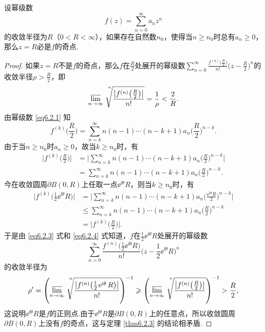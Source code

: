 \begin{prop}\label{prop6.2.4}
  设幂级数
  \[
    f(z) = \sum_{n=0}^\infty a_nz^n
  \]
  的收敛半径为$R$（$0<R<\infty$），如果存在自然数$n_0$，使得当$n\ge n_0$时总有$a_n\ge0$，那么$z=R$必是$f$的奇点.
\end{prop}
\begin{proof}
  如果$z=R$不是$f$的奇点，那么$f$在$\frac R2$处展开的幂级数$\sum_{n=0}^\infty
  \frac{f^{(n)}\big(\frac R2\big)}{n!}\bigg(z-\frac R2\bigg)^n$的收敛半径$\rho>\frac R2$，即
  \begin{equation}\label{eq6.2.3}
    \varlimsup_{n\to\infty}\sqrt[\leftroot{-4}\uproot{20}n]{
    \frac{\big|f^{(n)}\big(\frac R2\big)\big|}{n!}}=\frac1\rho<\frac2R.
  \end{equation}
  由幂级数 \eqref{eq6.2.1} 知
  \[
    f^{(k)}\bigg(\frac R2\bigg) = \sum_{n=k}^\infty n(n-1)\cdots(n-k+1)a_n
    \bigg(\frac R2\bigg)^{n-k}.
  \]
  由于当$n\ge n_0$时$a_n\ge0$，故当$k\ge n_0$时，有
  \begin{align*}
    \bigg|f^{(k)}\bigg(\frac R2\bigg)\bigg|
    & = \bigg|\sum_{n=k}^\infty n(n-1)\cdots(n-k+1)a_n\bigg(\frac R2\bigg)^{n-k}\bigg|\\
    & = \sum_{n=k}^\infty n(n-1)\cdots(n-k+1)a_n\bigg(\frac R2\bigg)^{n-k}.
  \end{align*}
  今在收敛圆周$\partial B(0,R)$上任取一点$\ee^{\ii\theta}R$，则当$k\ge n_0$时，有
  \begin{equation}\label{eq6.2.4}
    \begin{aligned}
      \bigg|f^{(k)}\bigg(\frac12\ee^{\ii\theta}R\bigg)\bigg|
      & = \bigg|\sum_{n=k}^\infty n(n-1)\cdots(n-k+1)a_n\bigg(\frac {\ee^{\ii\theta}R}2\bigg)^{n-k}\bigg|\\
      & \le \sum_{n=k}^\infty n(n-1)\cdots(n-k+1)a_n\bigg(\frac R2\bigg)^{n-k}\\
      & = \bigg|f^{(k)}\bigg(\frac R2\bigg)\bigg|.
    \end{aligned}
  \end{equation}
  于是由 \eqref{eq6.2.3} 式和 \eqref{eq6.2.4} 式知道，$f$在$\frac12\ee^{\ii\theta}R$处展开的幂级数
  \[
    \sum_{n=0}^\infty\frac{f^{(n)}\big(\frac12\ee^{\ii\theta}R\big)}{n!}
    \bigg(z-\frac12\ee^{\ii\theta}R\bigg)^n
  \]
  的收敛半径为
  \[
    \rho' = \left(\varlimsup_{n\to\infty}
    \sqrt[\leftroot{-4}\uproot{20}n]{
    \frac{\big|f^{(n)}\big(\frac 12\ee^{\ii\theta}R\big)\big|}{n!}}\right)^{-1}
    \ge\left(\varlimsup_{n\to\infty}\sqrt[\leftroot{-4}\uproot{20}n]{
    \frac{\big|f^{(n)}\big(\frac R2\big)\big|}{n!}}\right)^{-1}
    >\frac R2,
  \]
  这说明$\ee^{\ii\theta}R$是$f$的正则点.由于$\ee^{\ii\theta}R$是$\partial B(0,R)$上的任意点，所以收敛圆周$\partial B(0,R)$上没有$f$的奇点，这与定理 \ref{thm6.2.3} 的结论相矛盾.
\end{proof}

